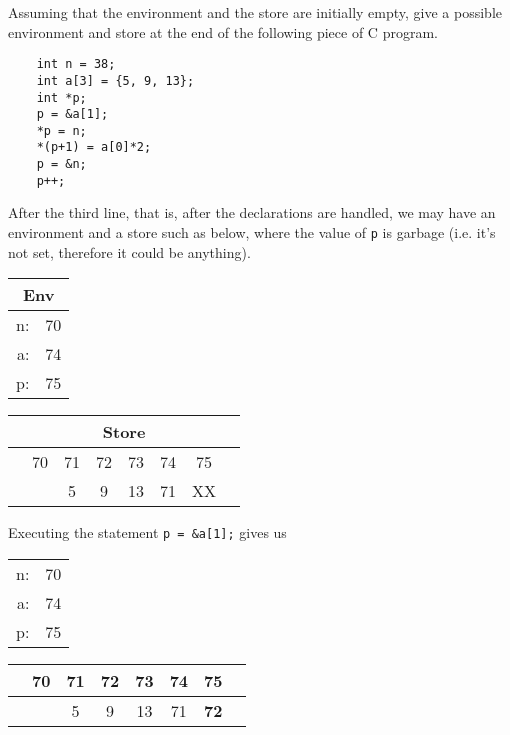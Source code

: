 \documentclass[addpoints]{exam}
\begin{document}
\begin{questions}
  \newpage
  \question
  Assuming that the environment and the store are initially empty,
  give a possible environment and store at the
  end of the following piece of C program.
  \begin{verbatim}
    int n = 38;
    int a[3] = {5, 9, 13};
    int *p;
    p = &a[1];
    *p = n;
    *(p+1) = a[0]*2;
    p = &n;
    p++;
  \end{verbatim}

  \begin{solution}
    After the third line, that is, after the declarations are handled, we may have
    an environment and a store such as below, where the value of \texttt{p} is
    garbage (i.e. it's not set, therefore it could be anything). 
    
    \begin{tabular}{|r c|}
      \multicolumn{2}{c}{Env}\\\hline
      n: & 70 \\
      a: & 74 \\
      p: & 75 \\
      \hline
    \end{tabular}
    \hspace{1cm}
    \begin{tabular}{c|c|c|c|c|c|c|c}
      \multicolumn{8}{c}{Store}\\
      \hline
      \multicolumn{1}{c}{} & \multicolumn{1}{c}{70} & \multicolumn{1}{c}{71} & \multicolumn{1}{c}{72} & \multicolumn{1}{c}{73} & \multicolumn{1}{c}{74} & \multicolumn{1}{c}{75} & \\\hline
      &  \bigstrut 38 &  5 &  9 & 13 & 71 & XX & \\[1ex]\hline
    \end{tabular}

    Executing the statement \texttt{p = &a[1];} gives us

    \begin{tabular}{|r c|}
      \hline
      n: & 70 \\
      a: & 74 \\
      p: & 75 \\
      \hline
    \end{tabular}
    \hspace{1cm}
    \begin{tabular}{c|c|c|c|c|c|c|c}
      \hline
      \multicolumn{1}{c}{} & \multicolumn{1}{c}{70} & \multicolumn{1}{c}{71} & \multicolumn{1}{c}{72} & \multicolumn{1}{c}{73} & \multicolumn{1}{c}{74} & \multicolumn{1}{c}{75} & \\\hline
      &  \bigstrut 38 &  5 &  9 & 13 & 71 & \textbf{72} & \\[1ex]\hline
    \end{tabular}
    

\end{solution}
\end{questions}
\end{document}

